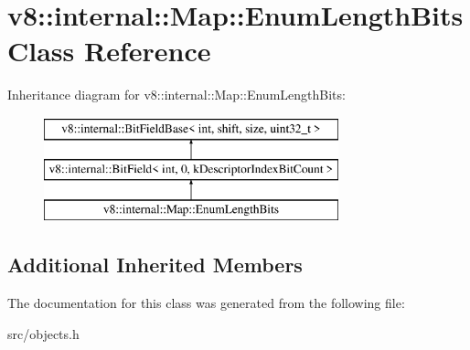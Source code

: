\hypertarget{classv8_1_1internal_1_1_map_1_1_enum_length_bits}{}\section{v8\+:\+:internal\+:\+:Map\+:\+:Enum\+Length\+Bits Class Reference}
\label{classv8_1_1internal_1_1_map_1_1_enum_length_bits}
Inheritance diagram for v8\+:\+:internal\+:\+:Map\+:\+:Enum\+Length\+Bits\+:\begin{figure}[H]
\begin{center}
\leavevmode
\includegraphics[height=3.000000cm]{classv8_1_1internal_1_1_map_1_1_enum_length_bits}
\end{center}
\end{figure}
\subsection*{Additional Inherited Members}


The documentation for this class was generated from the following file\+:\begin{DoxyCompactItemize}
\item 
src/objects.\+h\end{DoxyCompactItemize}

